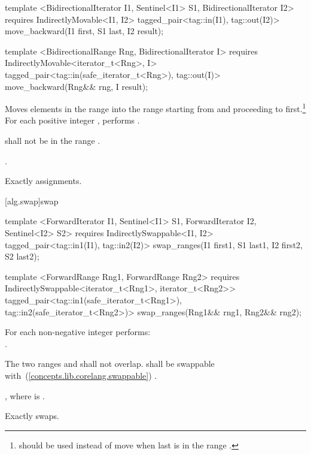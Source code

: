 %
\begin{itemdecl}
template <BidirectionalIterator I1, Sentinel<I1> S1, BidirectionalIterator I2>
  requires IndirectlyMovable<I1, I2>
  tagged_pair<tag::in(I1), tag::out(I2)>
    move_backward(I1 first, S1 last, I2 result);

template <BidirectionalRange Rng, BidirectionalIterator I>
  requires IndirectlyMovable<iterator_t<Rng>, I>
  tagged_pair<tag::in(safe_iterator_t<Rng>), tag::out(I)>
    move_backward(Rng&& rng, I result);
\end{itemdecl}

\begin{itemdescr}
\pnum
\effects
Moves elements in the range 
into the
range 
starting from
and proceeding to first.\footnote{
should be used instead of move when last
is in
the range
.}
For each positive integer
,
performs
.

\pnum
\requires
{}
shall not be in the range
.

\pnum
\returns
{}.

\pnum
\complexity
Exactly
assignments.
\end{itemdescr}

[alg.swap]{swap}

%
\begin{itemdecl}
template <ForwardIterator I1, Sentinel<I1> S1, ForwardIterator I2, Sentinel<I2> S2>
  requires IndirectlySwappable<I1, I2>
  tagged_pair<tag::in1(I1), tag::in2(I2)>
    swap_ranges(I1 first1, S1 last1, I2 first2, S2 last2);

template <ForwardRange Rng1, ForwardRange Rng2>
  requires IndirectlySwappable<iterator_t<Rng1>, iterator_t<Rng2>>
  tagged_pair<tag::in1(safe_iterator_t<Rng1>), tag::in2(safe_iterator_t<Rng2>)>
    swap_ranges(Rng1&& rng1, Rng2&& rng2);
\end{itemdecl}

\begin{itemdescr}
\pnum
\effects
For each non-negative integer 
performs: \\
.

\pnum
\requires
The two ranges 
and
shall not overlap.
 shall be swappable with~(\ref{concepts.lib.corelang.swappable})
.

\pnum
\returns
{}, where
 is .

\pnum
\complexity
Exactly
swaps.
\end{itemdescr}

